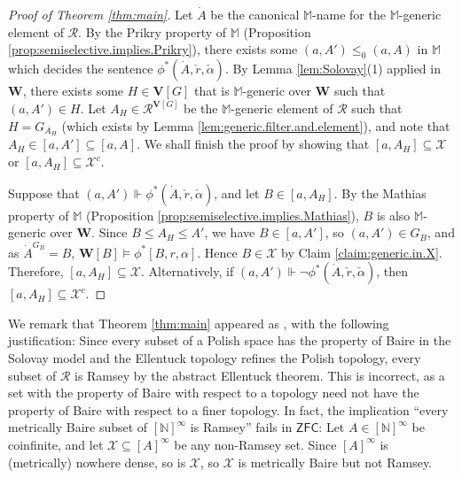 \documentclass[11pt,reqno]{amsart}
\theoremstyle{plain}
\numberwithin{equation}{section}
\theoremstyle{definition}
\newcommand{\N}{\mathbb{N}}
\newcommand{\cal}{\mathcal}
\renewcommand{\bf}{\mathbf}
\newcommand{\ZFC}{\mathsf{ZFC}}
\newcommand{\forces}{\Vdash}
\newcommand{\V}{\bf{V}}
\newcommand{\W}{\bf{W}}
\newcommand{\X}{\cal{X}}
\begin{document}
\begin{proof}[Proof of Theorem \ref{thm:main}]
    Let $\dot{A}$ be the canonical $\mathbb{M}$-name for the $\mathbb{M}$-generic element of $\cal{R}$. By the Prikry property of $\mathbb{M}$ (Proposition \ref{prop:semiselective.implies.Prikry}), there exists some $(a,A') \leq_0 (a,A)$ in $\mathbb{M}$ which decides the sentence $\phi^*(\dot{A},\check{r},\check{\alpha})$. By Lemma \ref{lem:Solovay}(1) applied in $\W$, there exists some $H \in \V[G]$ that is $\mathbb{M}$-generic over $\W$ such that $(a,A') \in H$. Let $A_H \in \cal{R}^{\V[G]}$ be the $\mathbb{M}$-generic element of $\cal{R}$ such that $H = G_{A_H}$ (which exists by Lemma \ref{lem:generic.filter.and.element}), and note that $A_H \in [a,A'] \subseteq [a,A]$. We shall finish the proof by showing that $[a,A_H] \subseteq \X$ or $[a,A_H] \subseteq \X^c$. 

    Suppose that $(a,A') \forces \phi^*(\dot{A},\check{r},\check{\alpha})$, and let $B \in [a,A_H]$. By the Mathias property of $\mathbb{M}$ (Proposition \ref{prop:semiselective.implies.Mathias}), $B$ is also $\mathbb{M}$-generic over $\W$. Since $B \leq A_H \leq A'$, we have $B \in [a,A']$, so $(a,A') \in G_B$, and as $\dot{A}^{G_B} = B$, $\W[B] \models \phi^*[B,r,\alpha]$. Hence $B \in \X$ by Claim \ref{claim:generic.in.X}. Therefore, $[a,A_H] \subseteq \X$. Alternatively, if $(a,A') \forces \neg\phi^*(\dot{A},\check{r},\check{\alpha})$, then $[a,A_H] \subseteq \X^c$.
\end{proof}

We remark that Theorem \ref{thm:main} appeared as \cite[Theorem 6.1]{Y24}, with the following justification: Since every subset of a Polish space has the property of Baire in the Solovay model and the Ellentuck topology refines the Polish topology, every subset of $\cal{R}$ is Ramsey by the abstract Ellentuck theorem. This is incorrect, as a set with the property of Baire with respect to a topology need not have the property of Baire with respect to a finer topology. In fact, the implication ``every metrically Baire subset of $[\N]^\infty$ is Ramsey'' fails in $\ZFC$: Let $A \in [\N]^\infty$ be coinfinite, and let $\X \subseteq [A]^\infty$ be any non-Ramsey set. Since $[A]^\infty$ is (metrically) nowhere dense, so is $\X$, so $\X$ is metrically Baire but not Ramsey.


\printbibliography[title={References}]
\end{document}

